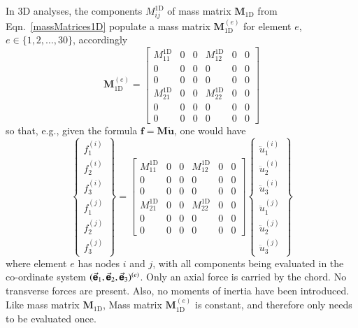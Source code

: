 In 3D analyses, the components $M^{\mathrm{1D}}_{ij}$ of mass matrix $\mathbf{M}_{\mathrm{1D}}$ from Eqn.~\eqref{massMatrices1D} populate a mass matrix $\boldsymbol{M}_{\mathrm{1D}}^{(e)}$ for element $e$, $e \in \{ 1,2,\ldots,30 \}$, accordingly
\begin{equation}
    \boldsymbol{M}_{\mathrm{1D}}^{(e)} = 
    \left[ \begin{array}{ccc|ccc}
    M_{11}^{\mathrm{1D}} & 0 & 0 & M_{12}^{\mathrm{1D}} & 0 & 0 \\
    0 & 0 & 0 & 0 & 0 & 0 \\
    0 & 0 & 0 & 0 & 0 & 0 \\ \hline
    M_{21}^{\mathrm{1D}} & 0 & 0 & M_{22}^{\mathrm{1D}} & 0 & 0 \\
    0 & 0 & 0 & 0 & 0 & 0 \\
    0 & 0 & 0 & 0 & 0 & 0
    \end{array} \right]
    \label{elementMassMatrix1D}
\end{equation}
so that, e.g., given the formula $\boldsymbol{f} = \mathbf{M} \ddot{\boldsymbol{u}}$, one would have
\begin{displaymath}
    \left\{ \begin{matrix}
    f^{(i)}_1 \\ f^{(i)}_2 \\ f^{(i)}_3 \\ \hline
    f^{(j)}_1 \\ f^{(j)}_2 \\ f^{(j)}_3
    \end{matrix} \right\} = 
    \left[ \begin{array}{ccc|ccc}
    M_{11}^{\mathrm{1D}} & 0 & 0 & M_{12}^{\mathrm{1D}} & 0 & 0 \\
    0 & 0 & 0 & 0 & 0 & 0 \\
    0 & 0 & 0 & 0 & 0 & 0 \\ \hline
    M_{21}^{\mathrm{1D}} & 0 & 0 & M_{22}^{\mathrm{1D}} & 0 & 0 \\
    0 & 0 & 0 & 0 & 0 & 0 \\
    0 & 0 & 0 & 0 & 0 & 0
    \end{array} \right] \left\{ \begin{matrix} 
    \ddot{u}^{(i)}_1 \\ \ddot{u}^{(i)}_2 \\ \ddot{u}^{(i)}_3 \\ \hline
    \ddot{u}^{(j)}_1 \\ \ddot{u}^{(j)}_2 \\ \ddot{u}^{(j)}_3
    \end{matrix} \right\} 
\end{displaymath}
where element $e$ has nodes $i$ and $j$, with all components being evaluated in the co-ordinate system $( \vec{\boldsymbol{\mathsf{e}}}_1 , \vec{\boldsymbol{\mathsf{e}}}_2 , \vec{\boldsymbol{\mathsf{e}}}_3 )^{(e)}$.  Only an axial force is carried by the chord.  No transverse forces are present.  Also, no moments of inertia have been introduced.  Like mass matrix $\mathbf{M}_{\mathrm{1D}}$, Mass matrix $\boldsymbol{M}_{\mathrm{1D}}^{(e)}$ is constant, and therefore only needs to be evaluated once.

